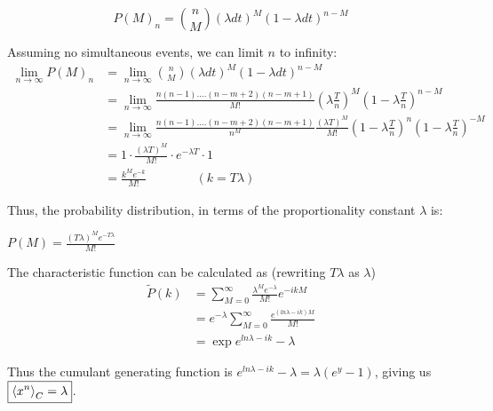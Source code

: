 \documentclass[12pt]{article}
\begin{document}
$$P(M)_n = {n\choose M}(\lambda dt)^M (1-\lambda dt)^{n-M}$$

Assuming no simultaneous events, we can limit $n$ to infinity:
\begin{align*}
\lim_{n\to\infty} P(M)_n &= \lim_{n\to\infty} {n\choose M}(\lambda dt)^M (1-\lambda dt)^{n-M}\\
&= \lim_{n\to\infty} \frac{n(n-1)....(n-m+2)(n-m+1)}{M!}\left(\lambda \frac{T}{n}\right)^M \left(1-\lambda \frac{T}{n}\right)^{n-M}\\
&= \lim_{n\to\infty} \frac{n(n-1)....(n-m+2)(n-m+1)}{n^M}\frac{\left(\lambda T\right)^M}{M!} \left(1-\lambda \frac{T}{n}\right)^n\left(1-\lambda \frac{T}{n}\right)^{-M}\\
&=1\cdot   \frac{\left(\lambda T\right)^M}{M!} \cdot  e^{-\lambda T} \cdot 1\\
&= \frac{k^M e^{-k}}{M!}\qquad\qquad (k = T\lambda)
\end{align*}


Thus, the probability distribution, in terms of the proportionality constant $\lambda$ is:

$\boxed{P(M) = \frac{(T\lambda)^M e^{-T\lambda}}{M!}}$

The characteristic function can be calculated as  (rewriting $T\lambda$ as $\lambda$)
\begin{align*}
\tilde{P}(k) &= \sum_{M=0}^\infty \frac{\lambda^M e^{-\lambda}}{M!}e^{-ikM}\\
&= e^{-\lambda}\sum_{M=0}^\infty \frac{e^{(ln\lambda-ik) M}}{M!}\\
&= \exp{e^{ln\lambda-ik}-\lambda}
\end{align*}

Thus the cumulant generating function is $e^{ln\lambda-ik}-\lambda = \lambda (e^{y} - 1)$, giving us $\boxed{\Braket{x^n}_C = \lambda}$.
\end{document}
